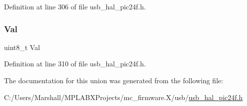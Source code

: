 Definition at line 306 of file usb\+\_\+hal\+\_\+pic24f.\+h.

\mbox{\label{union_____u_s_t_a_t_aa0c179f4462bb12ca1ed40d18c89cda1}} 
\subsubsection{\texorpdfstring{Val}{Val}}
{\footnotesize\ttfamily uint8\+\_\+t Val}



Definition at line 310 of file usb\+\_\+hal\+\_\+pic24f.\+h.



The documentation for this union was generated from the following file\+:\begin{DoxyCompactItemize}
\item 
C\+:/\+Users/\+Marshall/\+M\+P\+L\+A\+B\+X\+Projects/mc\+\_\+firmware.\+X/usb/\mbox{\hyperlink{usb__hal__pic24f_8h}{usb\+\_\+hal\+\_\+pic24f.\+h}}\end{DoxyCompactItemize}
